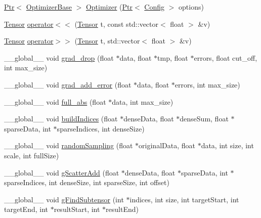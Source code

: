 \begin{DoxyCompactItemize}
\item 
\hyperlink{namespacemarian_ad1a373be43a00ef9ce35666145137b08}{Ptr}$<$ \hyperlink{classmarian_1_1OptimizerBase}{Optimizer\+Base} $>$ \hyperlink{namespacemarian_a38852784082dcc4b8e892b0751a04257}{Optimizer} (\hyperlink{namespacemarian_ad1a373be43a00ef9ce35666145137b08}{Ptr}$<$ \hyperlink{classmarian_1_1Config}{Config} $>$ options)
\item 
\hyperlink{namespacemarian_a88b71ec34bb354564cddc24eb80f7e14}{Tensor} \hyperlink{namespacemarian_ae2a878168bf7c77878fe977ede2eb842}{operator$<$$<$} (\hyperlink{namespacemarian_a88b71ec34bb354564cddc24eb80f7e14}{Tensor} t, const std\+::vector$<$ float $>$ \&v)
\item 
\hyperlink{namespacemarian_a88b71ec34bb354564cddc24eb80f7e14}{Tensor} \hyperlink{namespacemarian_ae120a5a7c3d0061ee7ba93a70537dc4b}{operator$>$$>$} (\hyperlink{namespacemarian_a88b71ec34bb354564cddc24eb80f7e14}{Tensor} t, std\+::vector$<$ float $>$ \&v)
\item 
\+\_\+\+\_\+global\+\_\+\+\_\+ void \hyperlink{namespacemarian_ad52c2ed4c1cb5883cc029c4d7ff500e3}{grad\+\_\+drop} (float $\ast$data, float $\ast$tmp, float $\ast$errors, float cut\+\_\+off, int max\+\_\+size)
\item 
\+\_\+\+\_\+global\+\_\+\+\_\+ void \hyperlink{namespacemarian_a73f09514b9433048ccaf4d07059fc6b9}{grad\+\_\+add\+\_\+error} (float $\ast$data, float $\ast$errors, int max\+\_\+size)
\item 
\+\_\+\+\_\+global\+\_\+\+\_\+ void \hyperlink{namespacemarian_a3c73193a12dc93840c7d8bfec3df5dd1}{full\+\_\+abs} (float $\ast$data, int max\+\_\+size)
\item 
\+\_\+\+\_\+global\+\_\+\+\_\+ void \hyperlink{namespacemarian_a2f5bce2be75828dd7d0484aa48830564}{build\+Indices} (float $\ast$dense\+Data, float $\ast$dense\+Sum, float $\ast$sparse\+Data, int $\ast$sparse\+Indices, int dense\+Size)
\item 
\+\_\+\+\_\+global\+\_\+\+\_\+ void \hyperlink{namespacemarian_aca9103c0b9695e03f87782c1ffc21d3a}{random\+Sampling} (float $\ast$original\+Data, float $\ast$data, int size, int scale, int full\+Size)
\item 
\+\_\+\+\_\+global\+\_\+\+\_\+ void \hyperlink{namespacemarian_adc3c4f8758198c5bc99f8ed1513592a8}{g\+Scatter\+Add} (float $\ast$dense\+Data, float $\ast$sparse\+Data, int $\ast$sparse\+Indices, int dense\+Size, int sparse\+Size, int offset)
\item 
\+\_\+\+\_\+global\+\_\+\+\_\+ void \hyperlink{namespacemarian_ad5d3e80a51721c2ad517fa4b1b85f0a3}{g\+Find\+Subtensor} (int $\ast$indices, int size, int target\+Start, int target\+End, int $\ast$result\+Start, int $\ast$result\+End)

\end{DoxyCompactItemize}
